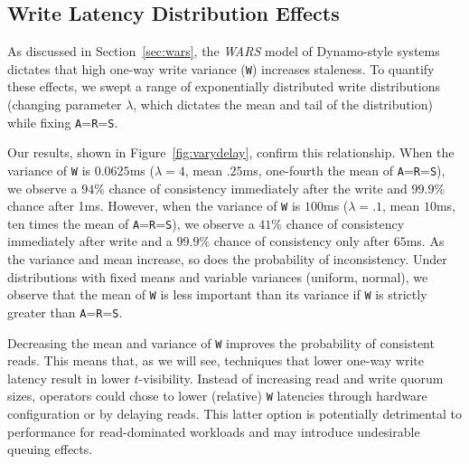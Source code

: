 \documentclass{vldb}
\newcommand{\subsectionskip}{-0em}
\begin{document}
\vspace{\subsectionskip}\subsection{Write Latency Distribution Effects}
\label{sec:synthetic}

As discussed in Section~\ref{sec:wars}, the \textit{WARS} model of
Dynamo-style systems dictates that high one-way write variance
(\texttt{W}) increases staleness.  To quantify these effects, we swept
a range of exponentially distributed write distributions (changing
parameter $\lambda$, which dictates the mean and tail of the
distribution) while fixing \texttt{A}=\texttt{R}=\texttt{S}.

Our results, shown in Figure~\ref{fig:varydelay}, confirm this
relationship.  When the variance of \texttt{W} is $0.0625$ms
($\lambda=4$, mean $.25$ms, one-fourth the mean of
\texttt{A}=\texttt{R}=\texttt{S}), we observe a $94\%$ chance of
consistency immediately after the write and $99.9\%$ chance after 1ms.
However, when the variance of \texttt{W} is $100$ms ($\lambda=.1$,
mean $10$ms, ten times the mean of \texttt{A}=\texttt{R}=\texttt{S}),
we observe a $41\%$ chance of consistency immediately after write and
a $99.9\%$ chance of consistency only after $65$ms.  As the variance
and mean increase, so does the probability of inconsistency.  Under
distributions with fixed means and variable variances (uniform,
normal), we observe that the mean of \texttt{W} is less important than
its variance if \texttt{W} is strictly greater than
\texttt{A}=\texttt{R}=\texttt{S}.

Decreasing the mean and variance of \texttt{W} improves the
probability of consistent reads.  This means that, as we will see,
techniques that lower one-way write latency result in lower
$t$-visibility.  Instead of increasing read and write quorum sizes,
operators could chose to lower (relative) \texttt{W} latencies through
hardware configuration or by delaying reads.  This latter option is
potentially detrimental to performance for read-dominated workloads and
may introduce undesirable queuing effects.
\end{document}
